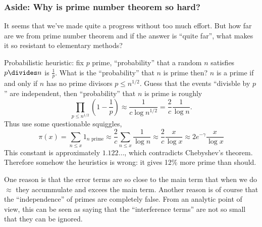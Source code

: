 \documentclass[a4paper]{article}
\theoremstyle{definition}
\begin{document}
\subsubsection{Aside: Why is prime number theorem so hard?}

It seems that we've made quite a progress without too much effort. But how far are we from prime number theorem and if the answer is ``quite far'', what makes it so resistant to elementary methods?

Probabilistic heuristic: fix \(p\) prime, ``probability'' that a random \(n\) satisfies \(p \divides n\) is \(\frac{1}{p}\). What is the ``probability'' that \(n\) is prime then? \(n\) is a prime if and only if \(n\) has no prime divisors \(p \leq n^{1/2}\). Guess that the events ``divisble by \(p\)'' are independent, then ``probability'' that \(n\) is prime is roughly
\[
  \prod_{p \leq n^{1/2}} \left( 1 - \frac{1}{p} \right)
  \approx \frac{1}{c \log n^{1/2}}
  = \frac{2}{c} \frac{1}{\log n}.
\]
Thus use some questionable squiggles,
\[
  \pi(x)
  = \sum_{n \leq x} 1_{n \text{ prime}}
  \approx \frac{2}{c} \sum_{n \leq x} \frac{1}{\log n}
  \approx \frac{2}{c} \frac{x}{\log x}
  \approx 2e^{-\gamma} \frac{x}{\log x}
\]
This constant is approximately \(1.122\dots\), which contradicts Chebyshev's theorem. Therefore somehow the heuristics is wrong: it gives 12\% more prime than should.

One reason is that the error terms are so close to the main term that when we do \(\approx\) they accummulate and excees the main term. Another reason is of course that the ``independence'' of primes are completely false. From an analytic point of view, this can be seen as saying that the ``interference terms'' are not so small that they can be ignored.
\end{document}
